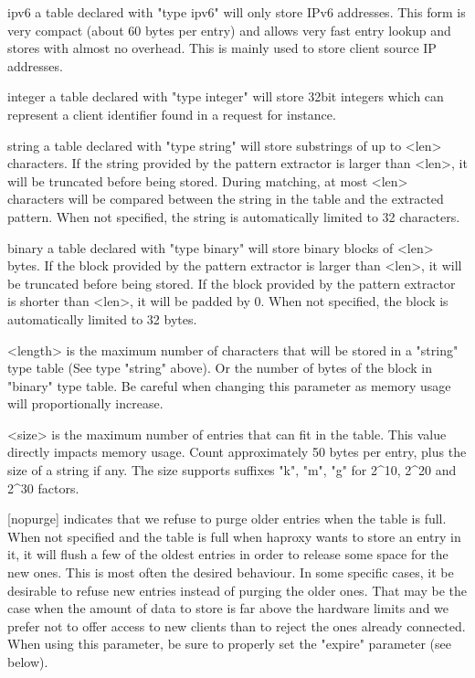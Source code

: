     ipv6       a table declared with "type ipv6" will only store IPv6 addresses.
               This form is very compact (about 60 bytes per entry) and allows
               very fast entry lookup and stores with almost no overhead. This
               is mainly used to store client source IP addresses.

    integer    a table declared with "type integer" will store 32bit integers
               which can represent a client identifier found in a request for
               instance.

    string     a table declared with "type string" will store substrings of up
               to <len> characters. If the string provided by the pattern
               extractor is larger than <len>, it will be truncated before
               being stored. During matching, at most <len> characters will be
               compared between the string in the table and the extracted
               pattern. When not specified, the string is automatically limited
               to 32 characters.

    binary     a table declared with "type binary" will store binary blocks
               of <len> bytes. If the block provided by the pattern
               extractor is larger than <len>, it will be truncated before
               being stored. If the block provided by the pattern extractor
               is shorter than <len>, it will be padded by 0. When not
               specified, the block is automatically limited to 32 bytes.

    <length>   is the maximum number of characters that will be stored in a
               "string" type table (See type "string" above). Or the number
               of bytes of the block in "binary" type table. Be careful when
               changing this parameter as memory usage will proportionally
               increase.

    <size>     is the maximum number of entries that can fit in the table. This
               value directly impacts memory usage. Count approximately
               50 bytes per entry, plus the size of a string if any. The size
               supports suffixes "k", "m", "g" for 2^10, 2^20 and 2^30 factors.

    [nopurge]  indicates that we refuse to purge older entries when the table
               is full. When not specified and the table is full when haproxy
               wants to store an entry in it, it will flush a few of the oldest
               entries in order to release some space for the new ones. This is
               most often the desired behaviour. In some specific cases, it
               be desirable to refuse new entries instead of purging the older
               ones. That may be the case when the amount of data to store is
               far above the hardware limits and we prefer not to offer access
               to new clients than to reject the ones already connected. When
               using this parameter, be sure to properly set the "expire"
               parameter (see below).

